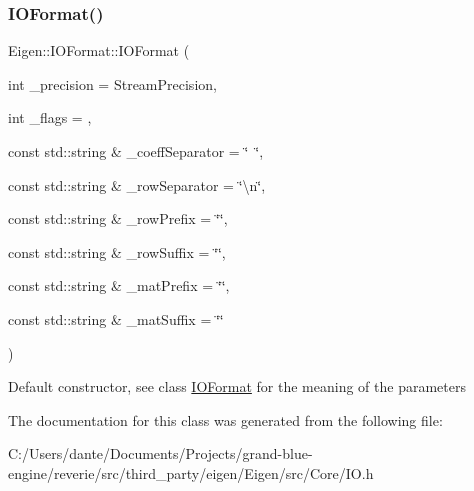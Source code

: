 \subsubsection{\texorpdfstring{IOFormat()}{IOFormat()}}
{\footnotesize\ttfamily Eigen\+::\+I\+O\+Format\+::\+I\+O\+Format (\begin{DoxyParamCaption}\item[{int}]{\+\_\+precision = {\ttfamily StreamPrecision},  }\item[{int}]{\+\_\+flags = {},  }\item[{const std\+::string \&}]{\+\_\+coeff\+Separator = {\ttfamily \char`\"{}~\char`\"{}},  }\item[{const std\+::string \&}]{\+\_\+row\+Separator = {\ttfamily \char`\"{}\textbackslash{}n\char`\"{}},  }\item[{const std\+::string \&}]{\+\_\+row\+Prefix = {\ttfamily \char`\"{}\char`\"{}},  }\item[{const std\+::string \&}]{\+\_\+row\+Suffix = {\ttfamily \char`\"{}\char`\"{}},  }\item[{const std\+::string \&}]{\+\_\+mat\+Prefix = {\ttfamily \char`\"{}\char`\"{}},  }\item[{const std\+::string \&}]{\+\_\+mat\+Suffix = {\ttfamily \char`\"{}\char`\"{}} }\end{DoxyParamCaption})\hspace{0.3cm}{\ttfamily [inline]}}

Default constructor, see class \mbox{\hyperlink{struct_eigen_1_1_i_o_format}{I\+O\+Format}} for the meaning of the parameters 

The documentation for this class was generated from the following file\+:\begin{DoxyCompactItemize}
\item 
C\+:/\+Users/dante/\+Documents/\+Projects/grand-\/blue-\/engine/reverie/src/third\+\_\+party/eigen/\+Eigen/src/\+Core/I\+O.\+h\end{DoxyCompactItemize}
